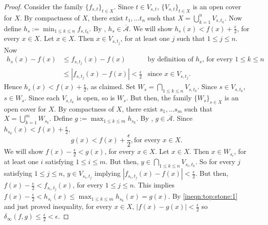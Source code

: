 \begin{proof}
Consider the family $\{ f_{s, t} \}_{t \in X}$.  Since $t \in V_{s,t}$, $\{V_{s,t} \}_{t \in X}$ is an open cover for $X$. By compactness of $X$, there exist $t_1, \ldots t_n$ such that $X = \bigcup_{k = 1}^{n} V_{s, t_k}$. Now define $h_s := \min_{1 \leq k \leq n} f_{s, t_{k}}$. By , $h_s \in \overline{\mathcal{A}}$. We will show $h_s(x) < f(x) + \frac{\epsilon}{2}$, for every $x \in X$. Let $x \in X$. Then $x \in V_{s, t_j}$, for at least one $j$ such that $1 \leq j \leq n$. Now
\begin{align*}
    h_s(x) - f(x) &\leq f_{s, t_j} (x) - f(x)  & \text{by definition of $h_s$, for every $1 \leq k \leq n$} \\
                  &\leq |f_{s, t_j} (x) - f(x)|  < \frac{\epsilon}{2} &  \text{since $x \in V_{s, t_{j}}$}.
\end{align*}
Hence $h_s(x) < f(x) + \frac{\epsilon}{2}$, as claimed.
Set $W_s = \bigcap_{1 \leq k \leq n} V_{s, t_{k}}$. Since $s \in V_{s, t_{k}}$, $s \in W_s$. Since each $V_{s, t_k}$ is open, so is $W_s$. But then, the family $\{W_s \}_{s \in X}$ is an open cover for $X$. By compactness of $X$, there exist $s_1, \ldots s_m$ such that $X = \bigcup_{k = 1}^{m} W_{s_k}$. Define $g := \max_{1 \leq k \leq m} h_{s_k}$. By , $g \in \overline{\mathcal{A}}$. Since $h_{s_k}(x) < f(x) + \frac{\epsilon}{2}$, \begin{equation}
    \label{ineqn:top:stone:1}
    g(x) < f(x) + \frac{\epsilon}{2}, \text{for every $x \in X$}.
\end{equation} We will show $f(x) - \frac{\epsilon}{2} < g(x)$, for every $x \in X$. Let $x \in X$. Then $x \in W_{s_i}$, for at least one $i$ satisfying $1 \leq i \leq m$. But then, $y \in \bigcap_{1 \leq k \leq n} V_{s_i, t_{k}}$. So for every $j$ satisfying $1 \leq j \leq n$, $y \in V_{s_i, t_j}$ implying $| f_{s_i, t_j} (x) - f(x) | < \frac{\epsilon}{2}$. But then, $f(x) - \frac{\epsilon}{2} < f_{s_i, t_j} (x)$, for every $1 \leq j \leq n$. This implies $f(x) - \frac{\epsilon}{2} < h_{s_i}(x) \leq  \max_{1 \leq k \leq m} h_{s_k}(x) = g(x)$.
By \ref{ineqn:top:stone:1} and just proved inequality, for every $x \in X$, $| f(x) - g(x) | < \frac{\epsilon}{2}$ so $\delta_\infty(f, g) \leq \frac{\epsilon}{2} < \epsilon$.
\end{proof}